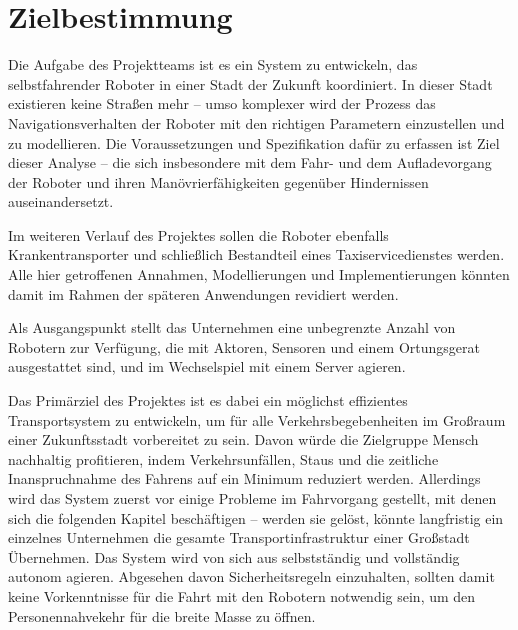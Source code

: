 
\section{Zielbestimmung}
	Die Aufgabe des Projektteams ist es ein System zu entwickeln, das selbstfahrender Roboter in einer Stadt der Zukunft koordiniert. In dieser Stadt existieren keine Straßen mehr – umso komplexer wird der Prozess das Navigationsverhalten der Roboter mit den richtigen Parametern einzustellen und zu modellieren. Die Voraussetzungen und Spezifikation dafür zu erfassen ist Ziel dieser Analyse – die sich insbesondere mit dem Fahr- und dem Aufladevorgang der Roboter und ihren Manövrierfähigkeiten gegenüber Hindernissen auseinandersetzt.

	Im weiteren Verlauf des Projektes sollen die Roboter ebenfalls Krankentransporter und schließlich Bestandteil eines Taxiservicedienstes werden. Alle hier getroffenen Annahmen, Modellierungen und Implementierungen könnten damit im Rahmen der späteren Anwendungen revidiert werden.

	Als Ausgangspunkt stellt das Unternehmen eine unbegrenzte Anzahl von Robotern zur Verfügung, die mit Aktoren, Sensoren und einem Ortungsgerat ausgestattet sind, und im Wechselspiel mit einem Server agieren.

	Das Primärziel des Projektes ist es dabei ein möglichst effizientes Transportsystem zu entwickeln, um für alle Verkehrsbegebenheiten im Großraum einer Zukunftsstadt vorbereitet zu sein. Davon würde die Zielgruppe Mensch nachhaltig profitieren, indem Verkehrsunfällen, Staus und die zeitliche Inanspruchnahme des Fahrens auf ein Minimum reduziert werden. Allerdings wird das System zuerst vor einige Probleme im Fahrvorgang gestellt, mit denen sich die folgenden Kapitel beschäftigen – werden sie gelöst, könnte langfristig ein einzelnes Unternehmen die gesamte Transportinfrastruktur einer Großstadt Übernehmen. Das System wird von sich aus selbstständig und vollständig autonom agieren. Abgesehen davon Sicherheitsregeln einzuhalten, sollten damit keine Vorkenntnisse für die Fahrt mit den Robotern notwendig sein, um den Personennahvekehr für die breite Masse zu öffnen.

	\pagebreak
